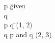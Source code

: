 \documentclass{article}
\begin{document}
\begin{proofbox}
\: p \= \hbox{given} \\
\open
\: q \= \asm \\
\: p \land q \= \andintro(1, 2) \\
\close
\: q \rightarrow p and q \= \impliesintro(2, 3) \\
\end{proofbox}
\end{document}
